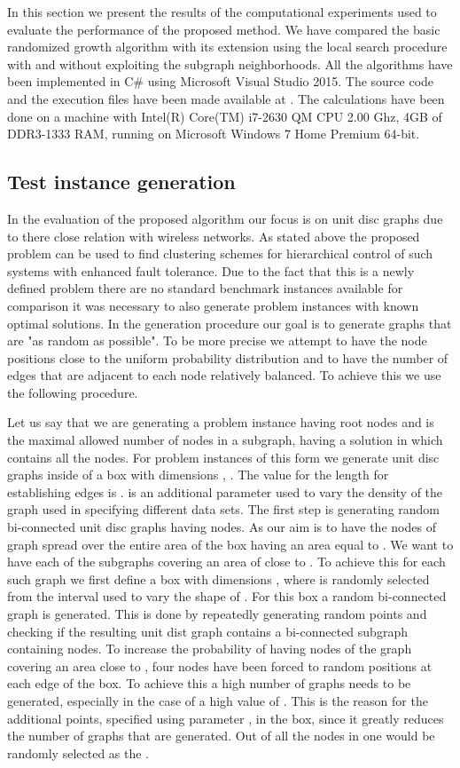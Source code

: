 In this section we present the results of the computational experiments used to evaluate the  performance of the proposed  method. We have compared the basic randomized growth algorithm with its extension using the local search procedure with and without exploiting the subgraph neighborhoods. All the algorithms  have been implemented in C\# using Microsoft Visual Studio 2015. The source code and the execution files have been made available at \citep{Data}. The calculations have been done on a machine with Intel(R) Core(TM) i7-2630 QM CPU \@ 2.00 Ghz, 4GB of DDR3-1333 RAM, running on Microsoft Windows 7 Home Premium 64-bit. 

\subsection{Test instance generation}
In the evaluation of the proposed algorithm our focus is on unit disc graphs due to there close relation with wireless networks. As  stated above the proposed problem can be used to find   clustering schemes for hierarchical control of such systems with enhanced fault tolerance.  
Due to the fact that this is a newly defined problem there are no standard benchmark instances available for comparison it was necessary to also generate  problem instances with known optimal solutions. In the generation procedure our goal is to generate graphs that are "as random as possible". To be more precise we attempt to have the node positions close to the uniform probability distribution and to have the number of edges that are adjacent to each node relatively balanced. To achieve this we use the following procedure. 

Let us say that we are generating a problem instance having  root nodes and  is the maximal allowed number of nodes in a subgraph, having a solution in which  contains all the nodes. 
For problem instances of this form  we generate unit disc graphs inside of a box   with dimensions , . 
The value for the length for establishing edges is .  is an additional parameter used to vary the density of the graph used in specifying different data sets. The first step is generating   random bi-connected unit disc graphs having  nodes.  As our aim is to have the nodes of graph  spread over the entire area of the box  having an area equal to . We want to have each of the subgraphs  covering an area of close to . To achieve this  for each such graph we first define a box with dimensions ,   where  is randomly selected  from the interval  used to vary the shape of .  For this box a random bi-connected graph  is generated. This is done by repeatedly generating  random points and checking if the resulting unit dist graph contains a bi-connected subgraph  containing  nodes. To increase the probability of having nodes of the graph covering an area close to , four nodes have been forced to random positions at each edge of the  box.  To achieve this a high number of graphs needs to be generated, especially in the case of a high value of . This is the reason for the additional points, specified using parameter , in the box, since it greatly reduces the number of graphs that are generated.  Out of all the nodes in  one would be randomly selected as the .

